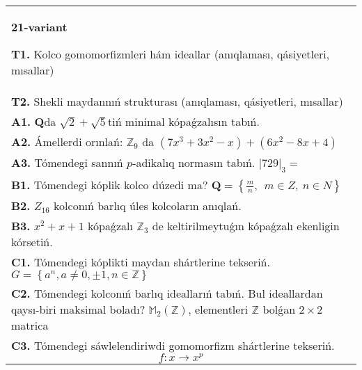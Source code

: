 \documentclass{article}
\begin{document}
\begin{tabular}{m{17cm}}
\textbf{21-variant}
\newline

\textbf{T1.} Kolco gomomorfizmleri hám ideallar (anıqlaması, qásiyetleri, mısallar) \\
\textbf{T2.} Shekli maydannıń strukturası (anıqlaması, qásiyetleri, mısallar) \\
\textbf{A1.} \(\mathbf{Q}\)da \(\sqrt{2} + \sqrt{5}\)tiń minimal kópaǵzalısın tabıń. \\
\textbf{A2.} Ámellerdi orınlań: \(\mathbb{Z}_{9}\) da \(\left( 7x^{3} + 3x^{2} - x \right) + \left( 6x^{2} - 8x + 4 \right)\) \\
\textbf{A3.} Tómendegi sannıń \(p\)-adikalıq normasın tabıń. \(|729|_{3} =\) \\
\textbf{B1.} Tómendegi kóplik kolco dúzedi ma? \(\mathbf{Q} = \left\{ \frac{m}{n},\ \ m \in Z,\ n \in N \right\}\) \\
\textbf{B2.} \(Z_{16}\) kolconıń barlıq úles kolcoların anıqlań. \\
\textbf{B3.} \(x^{2} + x + 1\) kópaǵzalı \(\mathbb{Z}_{3}\) de keltirilmeytuǵın kópaǵzalı ekenligin kórsetiń. \\
\textbf{C1.} Tómendegi kóplikti maydan shártlerine tekseriń. \(G = \left\{ a^{n},a \neq 0, \pm 1,n \in \mathbb{Z} \right\}\) \\
\textbf{C2.} Tómendegi kolconıń barlıq ideallarıń tabıń. Bul ideallardan qaysı-biri maksimal boladı? \(\mathbb{M}_{2}\left( \mathbb{Z} \right)\), elementleri \(\mathbb{Z}\) bolǵan \(2 \times 2\) matrica \\
\textbf{C3.} Tómendegi sáwlelendiriwdi gomomorfizm shártlerine tekseriń.
\[f:x \rightarrow x^{p}\] \\

\end{tabular}
\vspace{1cm}
\end{document}
